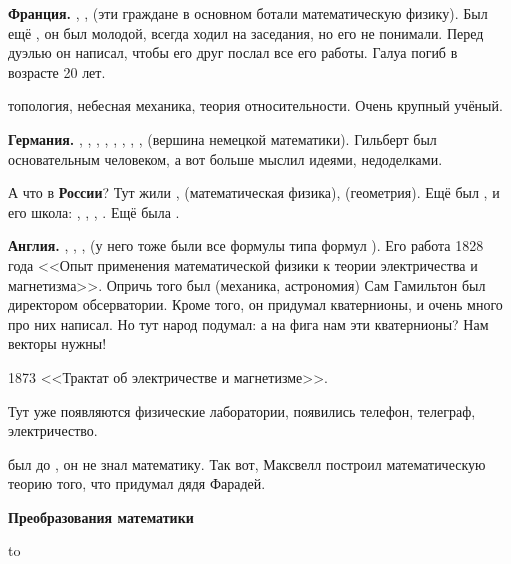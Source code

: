 \documentclass[a4paper,oneside,fleqn,10pt]{article}
\begin{document}
\textbf{Франция.} , ,  (эти
граждане в основном ботали математическую физику).  Был ещё
, он был молодой, всегда ходил на заседания, но его не
понимали.  Перед дуэлью он написал, чтобы его друг послал
 все его работы.  Галуа погиб в возрасте 20 лет.

 топология, небесная механика, теория
относительности. Очень крупный учёный.

\textbf{Германия.} , , ,
, , , ,
,  (вершина немецкой
математики). Гильберт был основательным человеком, а вот
 больше мыслил идеями, недоделками.

А что в \textbf{России}? Тут жили ,
 (математическая физика), 
(геометрия). Ещё был , и его школа: ,
, , . Ещё была
.

\textbf{Англия.} , ,
,  (у него тоже были все формулы типа формул
).  Его работа 1828 года <<Опыт
применения математической физики к теории электричества и
магнетизма>>.  Опричь того был  (механика, астрономия)
Сам Гамильтон был директором обсерватории.  Кроме того, он придумал
кватернионы, и очень много про них написал.  Но тут народ подумал: а
на фига нам эти кватернионы? Нам векторы нужны!

1873  <<Трактат об электричестве и магнетизме>>.

Тут уже появляются физические лаборатории, появились телефон,
телеграф, электричество.

 был до , он не знал
математику. Так вот, Максвелл построил математическую теорию того, что
придумал дядя Фарадей.

\textbf{Преобразования математики}

\halign to 
\end{document}
